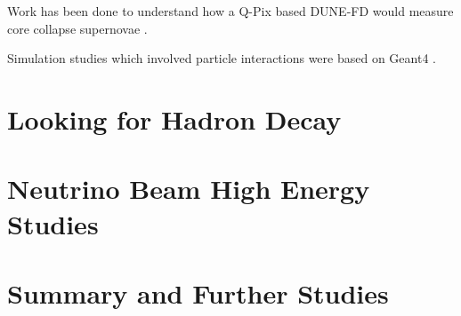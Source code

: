 Work has been done to understand how a Q-Pix based DUNE-FD would measure core collapse supernovae \citep{qpix:shion}.

Simulation studies which involved particle interactions were based on Geant4 \citep{geant4:AGOSTINELLI2003250}.


\section{Looking for Hadron Decay}

\section{Neutrino Beam High Energy Studies}

\section{Summary and Further Studies}
